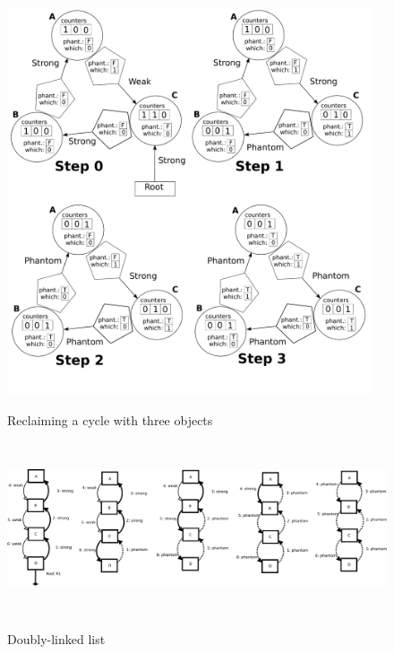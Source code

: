\begin{figure}[!t]
  \centering
  {\includegraphics[height=4.5in]{figs/method}\label{fig:example1}}
  \caption{Reclaiming a cycle with three objects}%
  \label{ex1}
\end{figure}

\begin{figure}[!t]
  \centering
  {\includegraphics[height=2.0in]{figs/doublylinkedlist}\label{fig:example2}}
 \caption{Doubly-linked list}%
  \label{ex2}
\end{figure}

